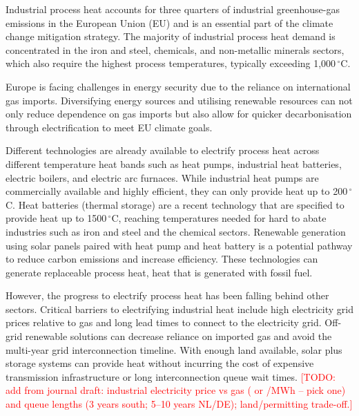 \documentclass[11pt]{article}
\newcommand{\todo}[1]{\textcolor{red}{[TODO: #1]}}
\begin{document}

Industrial process heat accounts for three quarters of industrial greenhouse-gas emissions in the European Union (EU)\cite{rehfeldt2024} and is an essential part of the climate change mitigation strategy\cite{madeddu2020}. The majority of industrial process heat demand is concentrated in the iron and steel, chemicals, and non-metallic minerals sectors, which also require the highest process temperatures, typically exceeding 1,000\,$^\circ$C\cite{rehfeldt2024}.

Europe is facing challenges in energy security due to the reliance on international gas imports\cite{rosenow2025nrct}. Diversifying energy sources and utilising renewable resources can not only reduce dependence on gas imports but also allow for quicker decarbonisation through electrification to meet EU climate goals.

Different technologies are already available to electrify process heat across different temperature heat bands such as heat pumps, industrial heat batteries, electric boilers, and electric arc furnaces. While industrial heat pumps are commercially available and highly efficient, they can only provide heat up to 200\,$^\circ$C\cite{iea2026renewablesindustry}. Heat batteries (thermal storage) are a recent technology that are specified to provide heat up to 1500\,$^\circ$C, reaching temperatures needed for hard to abate industries such as iron and steel and the chemical sectors\cite{rondo2026}. Renewable generation using solar panels paired with heat pump and heat battery is a potential pathway to reduce carbon emissions and increase efficiency\cite{wikoff2025}. These technologies can generate replaceable process heat, heat that is generated with fossil fuel.

However, the progress to electrify process heat has been falling behind other sectors\cite{rosenow2025erss}. Critical barriers to electrifying industrial heat include high electricity grid prices relative to gas\cite{rosenow2025erss} and long lead times to connect to the electricity grid\cite{chojkiewicz2026,baselovic2026}. Off-grid renewable solutions can decrease reliance on imported gas\cite{baselovic2026} and avoid the multi-year grid interconnection timeline\cite{ember2026crossedwires}. With enough land available, solar plus storage systems can provide heat without incurring the cost of expensive transmission infrastructure or long interconnection queue wait times\cite{dominguez2025us}.
\todo{add from journal draft: industrial electricity price vs gas (\texteuro162 or \texteuro171/MWh -- pick one) and queue lengths (3 years south; 5--10 years NL/DE); land/permitting trade-off.}
\end{document}
